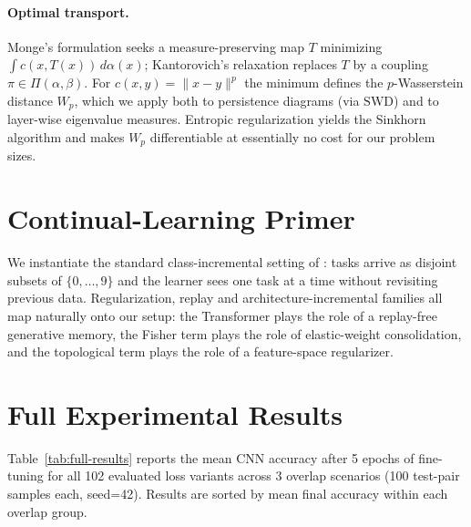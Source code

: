 \documentclass{article}
\newcommand{\SWD}{\mathrm{SWD}}
\begin{document}
\paragraph{Optimal transport.}
Monge's formulation seeks a measure-preserving map $T$ minimizing
$\int c(x,T(x))\,d\alpha(x)$; Kantorovich's relaxation replaces $T$ by a
coupling $\pi\in\Pi(\alpha,\beta)$.  For $c(x,y)=\|x-y\|^p$ the minimum
defines the $p$-Wasserstein distance $W_p$, which we apply both to
persistence diagrams (via $\SWD$) and to layer-wise eigenvalue measures.
Entropic regularization \citep{peyreCourseNotesComputational} yields the
Sinkhorn algorithm and makes $W_p$ differentiable at essentially no cost
for our problem sizes.

\section{Continual-Learning Primer}
\label{app:cl}

We instantiate the standard class-incremental setting of
\citet{wangComprehensiveSurveyContinual2024,janv.2022ContinualLearningCourse}:
tasks arrive as disjoint subsets of $\{0,\ldots,9\}$ and the learner sees
one task at a time without revisiting previous data.  Regularization,
replay and architecture-incremental families
\citep{yoonFederatedContinualLearning2021,qiBetterGenerativeReplay2023,shinContinualLearningDeep2017,rosascoDistilledReplayOvercoming2021}
all map naturally onto our setup: the Transformer plays the role of
a replay-free generative memory, the Fisher term plays the role of
elastic-weight consolidation, and the topological term plays the role
of a feature-space regularizer.

\section{Full Experimental Results}
\label{app:full-results}

Table~\ref{tab:full-results} reports the mean CNN accuracy after 5 epochs
of fine-tuning for all 102 evaluated loss variants across 3 overlap
scenarios (100 test-pair samples each, seed=42).  Results are sorted by
mean final accuracy within each overlap group.
\end{document}
